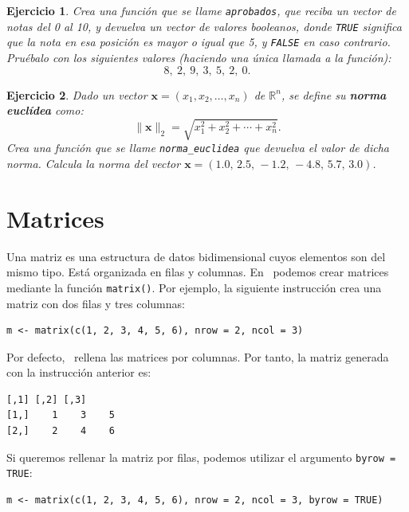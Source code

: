 \documentclass[11pt,a4paper]{article}
\newcommand{\R}{\textcolor{azuluc}{\faIcon{r-project}}}
\theoremstyle{exercise}
\newtheorem{exercise}{Ejercicio}
\begin{document}
\begin{exercise} Crea una función que se llame \verb|aprobados|, que reciba un vector de notas del 0 al 10, y devuelva un vector de valores booleanos, donde \texttt{TRUE} significa que la nota en esa posición es mayor o igual que 5, y \texttt{FALSE} en caso contrario. Pruébalo con los siguientes valores (haciendo una única llamada a la función):
\[ 8,\ 2,\ 9,\ 3,\ 5,\ 2,\ 0. \]
\end{exercise}


\begin{exercise} Dado un vector $\textbf{x} = (x_1,x_2,\ldots,x_n)$ de $\mathbb{R}^n$, se define su \textbf{norma euclídea} como:
\[ \lVert \textbf{x} \rVert_2 = \sqrt{x_1^2+x_2^2+\cdots+x_n^2}. \]
Crea una función que se llame \verb|norma_euclidea| que devuelva el valor de dicha norma. Calcula la norma del vector $\textbf{x} = (1.0,\, 2.5,\, -1.2,\, -4.8,\, 5.7,\, 3.0)$.
\end{exercise}



\section{Matrices}

Una matriz es una estructura de datos bidimensional cuyos elementos son del mismo tipo. Está organizada en filas y columnas. En \R\ podemos crear matrices mediante la función \texttt{matrix()}. Por ejemplo, la siguiente instrucción crea una matriz con dos filas y tres columnas:

\begin{lstlisting}[style=rstyle]
m <- matrix(c(1, 2, 3, 4, 5, 6), nrow = 2, ncol = 3)
\end{lstlisting}

Por defecto, \R\ rellena las matrices por columnas. Por tanto, la matriz generada con la instrucción anterior es:

\begin{lstlisting}[style=routput]
     [,1] [,2] [,3]
[1,]    1    3    5
[2,]    2    4    6
\end{lstlisting}

\noindent Si queremos rellenar la matriz por filas, podemos utilizar el argumento \texttt{byrow = TRUE}:

\begin{lstlisting}[style=rstyle]
m <- matrix(c(1, 2, 3, 4, 5, 6), nrow = 2, ncol = 3, byrow = TRUE)
\end{lstlisting}
\end{document}
